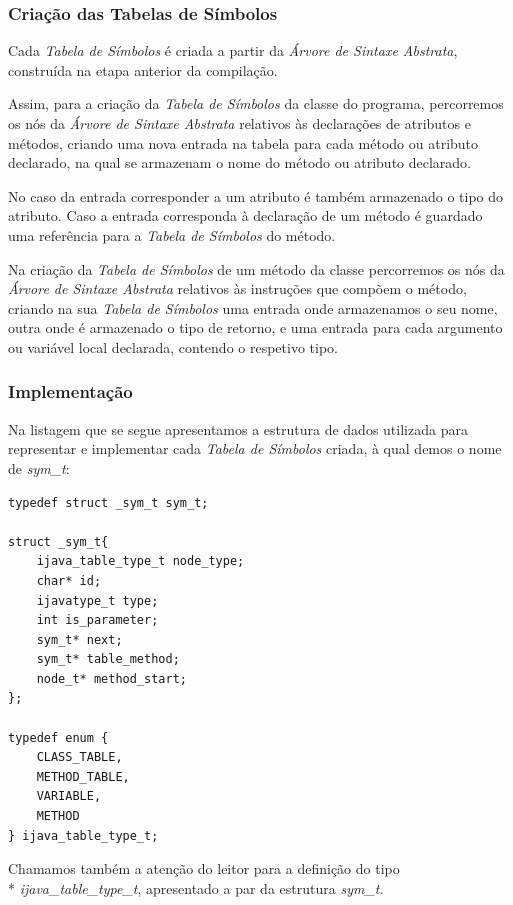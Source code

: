 \documentclass[11pt,a4paper]{article}
\begin{document}
	\subsubsection{Criação das Tabelas de Símbolos}
	
	Cada \emph{Tabela de Símbolos} é criada a partir da \emph{Árvore de Sintaxe Abstrata}, construída na etapa anterior da compilação.
	
	Assim, para a criação da \emph{Tabela de Símbolos} da classe do programa, percorremos os nós da \emph{Árvore de Sintaxe Abstrata} relativos às declarações de atributos e métodos, criando uma nova entrada na tabela para cada método ou atributo declarado, na qual se armazenam o nome do método ou atributo declarado.
	
	No caso da entrada corresponder a um atributo é também armazenado o tipo do atributo. Caso a entrada corresponda à declaração de um método é guardado uma referência para a \emph{Tabela de Símbolos} do método.
	
	Na criação da \emph{Tabela de Símbolos} de um método da classe percorremos os nós da \emph{Árvore de Sintaxe Abstrata} relativos às instruções que compõem o método, criando na sua \emph{Tabela de Símbolos} uma entrada onde armazenamos o seu nome, outra onde é armazenado o tipo de retorno, e uma entrada para cada argumento ou variável local declarada, contendo o respetivo tipo.
	
	\subsubsection{Implementação}
	
	Na listagem que se segue apresentamos a estrutura de dados utilizada para representar e implementar cada \emph{Tabela de Símbolos} criada, à qual demos o nome de \emph{sym\_t}:
	
	\begin{lstlisting}
typedef struct _sym_t sym_t;	

struct _sym_t{
	ijava_table_type_t node_type;
	char* id;
	ijavatype_t type;
	int is_parameter;
	sym_t* next;
	sym_t* table_method;
	node_t* method_start;
};

typedef enum {
	CLASS_TABLE,
	METHOD_TABLE,
	VARIABLE,
	METHOD
} ijava_table_type_t;
	\end{lstlisting}
	
	Chamamos também a atenção do leitor para a definição do tipo \\* \emph{ijava\_table\_type\_t}, apresentado a par da estrutura \emph{sym\_t}.
	
\end{document}

